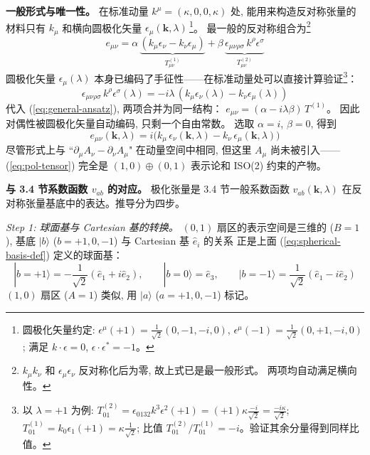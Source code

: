 \textbf{一般形式与唯一性。}
在标准动量 $k^\mu=(\kappa,0,0,\kappa)$ 处,
能用来构造反对称张量的材料只有 $k_\mu$ 和横向圆极化矢量
$\epsilon_\mu(\mathbf{k},\lambda)$\,\footnote{%
圆极化矢量约定: $\epsilon^\mu(+1)=\frac{1}{\sqrt{2}}(0,-1,-i,0)$,
$\epsilon^\mu(-1)=\frac{1}{\sqrt{2}}(0,+1,-i,0)$;
满足 $k\cdot\epsilon=0$, $\epsilon\cdot\epsilon^*=-1$。}。
最一般的反对称组合为\footnote{%
$k_\mu k_\nu$ 和 $\epsilon_\mu\epsilon_\nu$ 反对称化后为零, 故上式已是最一般形式。
两项均自动满足横向性。}
\begin{equation}
    e_{\mu\nu} = \alpha\,\underbrace{(k_\mu\epsilon_\nu - k_\nu\epsilon_\mu)}_{T^{(1)}_{\mu\nu}}
    + \beta\,\underbrace{\epsilon_{\mu\nu\rho\sigma}\,k^\rho\epsilon^\sigma}_{T^{(2)}_{\mu\nu}}
    \label{eq:general-ansatz}
\end{equation}
圆极化矢量 $\epsilon_\mu(\lambda)$ 本身已编码了手征性——在标准动量处可以直接计算验证\footnote{%
以 $\lambda=+1$ 为例: $T^{(2)}_{01} = \epsilon_{0132}k^3\epsilon^2(+1)
= (+1)\kappa\frac{-i}{\sqrt{2}} = \frac{-i\kappa}{\sqrt{2}}$;
$T^{(1)}_{01} = k_0\epsilon_1(+1) = \kappa\frac{1}{\sqrt{2}}$;
比值 $T^{(2)}_{01}/T^{(1)}_{01}=-i$。验证其余分量得到同样比值。}：
\begin{equation}
    \epsilon_{\mu\nu\rho\sigma}\,k^\rho\epsilon^\sigma(\lambda)
    = -i\lambda\,(k_\mu\epsilon_\nu(\lambda) - k_\nu\epsilon_\mu(\lambda))
    \label{eq:duality-auto}
\end{equation}
代入 (\ref{eq:general-ansatz}), 两项合并为同一结构：
$e_{\mu\nu} = (\alpha - i\lambda\beta)\,T^{(1)}$。
因此对偶性被圆极化矢量自动编码, 只剩一个自由常数。
选取 $\alpha=i$, $\beta=0$, 得到
\begin{equation}
    \boxed{e_{\mu\nu}(\mathbf{k},\lambda) =
    i\bigl(k_\mu\,\epsilon_\nu(\mathbf{k},\lambda) - k_\nu\,\epsilon_\mu(\mathbf{k},\lambda)\bigr)}
    \label{eq:pol-tensor}
\end{equation}
尽管形式上与 ``$\partial_\mu A_\nu - \partial_\nu A_\mu$" 在动量空间中相同,
但这里 $A_\mu$ 尚未被引入——(\ref{eq:pol-tensor})
完全是 $(1,0)\oplus(0,1)$ 表示论和 ISO(2) 约束的产物。

\textbf{与 3.4 节系数函数 $v_{ab}$ 的对应。}
极化张量是 3.4 节一般系数函数 $v_{ab}(\mathbf{k},\lambda)$
在反对称张量基底中的表达。推导分为四步。

\textit{Step 1: 球面基与 Cartesian 基的转换。}
$(0,1)$ 扇区的表示空间是三维的 ($B=1$),
基底 $|b\rangle$ ($b=+1,0,-1$) 与 Cartesian 基 $\hat{e}_i$ 的关系
正是上面 (\ref{eq:spherical-basis-def}) 定义的球面基：
\begin{equation}
    |b=+1\rangle = -\frac{1}{\sqrt{2}}(\hat{e}_1 + i\hat{e}_2), \qquad
    |b=0\rangle = \hat{e}_3, \qquad
    |b=-1\rangle = \frac{1}{\sqrt{2}}(\hat{e}_1 - i\hat{e}_2)
\end{equation}
$(1,0)$ 扇区 ($A=1$) 类似, 用 $|a\rangle$ ($a=+1,0,-1$) 标记。

